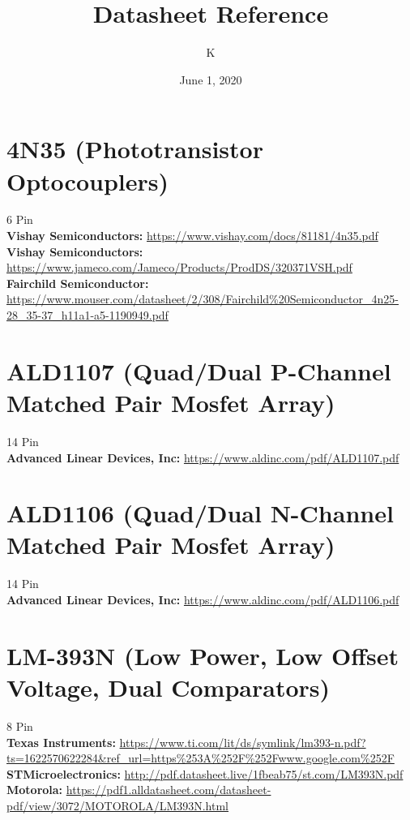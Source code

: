 \documentclass[10pt, letterpaper]{article}
\title{Datasheet Reference}
\author{K}
\date{June 1, 2020}
\begin{document}
\begin{comment}
\begin{titlepage}
    \maketitle
\end{titlepage}
\end{comment}

\maketitle

\tableofcontents{}
\pagebreak

\section{4N35 (Phototransistor Optocouplers)}
6 Pin\\
\textbf{Vishay Semiconductors:} \url{https://www.vishay.com/docs/81181/4n35.pdf}\\
\textbf{Vishay Semiconductors:} \url{https://www.jameco.com/Jameco/Products/ProdDS/320371VSH.pdf}\\
\textbf{Fairchild Semiconductor:} \url{https://www.mouser.com/datasheet/2/308/Fairchild%20Semiconductor_4n25-28_35-37_h11a1-a5-1190949.pdf}

\section{ALD1107 (Quad/Dual P-Channel Matched Pair Mosfet Array)}
14 Pin\\
\textbf{Advanced Linear Devices, Inc:} \url{https://www.aldinc.com/pdf/ALD1107.pdf}

\section{ALD1106 (Quad/Dual N-Channel Matched Pair Mosfet Array)}
14 Pin\\
\textbf{Advanced Linear Devices, Inc:} \url{https://www.aldinc.com/pdf/ALD1106.pdf}

\section{LM-393N (Low Power, Low Offset Voltage, Dual Comparators)}
8 Pin\\
\textbf{Texas Instruments: } \url{https://www.ti.com/lit/ds/symlink/lm393-n.pdf?ts=1622570622284&ref_url=https%253A%252F%252Fwww.google.com%252F}\\
\textbf{STMicroelectronics: } \url{http://pdf.datasheet.live/1fbeab75/st.com/LM393N.pdf}\\
\textbf{Motorola: } \url{https://pdf1.alldatasheet.com/datasheet-pdf/view/3072/MOTOROLA/LM393N.html}
\end{document}
